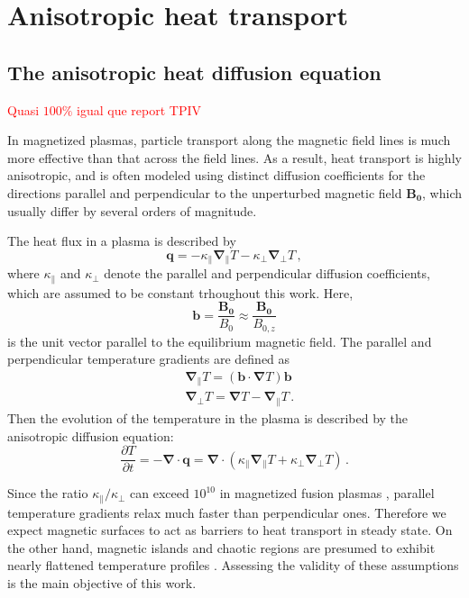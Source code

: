 \section{Anisotropic heat transport}
\subsection{The anisotropic heat diffusion equation}
\textcolor{red}{Quasi $100\%$ igual que report TPIV}

In magnetized plasmas, particle transport along the magnetic field lines is much more effective than that across the field lines. As a result, heat transport is highly anisotropic, and is often modeled using distinct diffusion coefficients for the directions parallel and perpendicular to the unperturbed magnetic field $\mathbf{B_0}$, which usually differ by several orders of magnitude.

The heat flux in a plasma is described by 
\begin{equation}
    \mathbf{q}=-\kappa_\parallel\boldsymbol{\nabla}_\parallel T - \kappa_\perp\boldsymbol{\nabla}_\perp T\,,
\end{equation}
where $\kappa_\parallel$ and $\kappa_\perp$ denote the parallel and perpendicular diffusion coefficients, which are assumed to be constant trhoughout this work. Here,
\begin{equation}
    \mathbf{b}=\frac{\mathbf{B_0}}{B_0}\approx\frac{\mathbf{B_0}}{B_{0,z}}
\end{equation}
is the unit vector parallel to the equilibrium magnetic field. The parallel and perpendicular temperature gradients are defined as
\begin{align}
    &\boldsymbol{\nabla}_\parallel T=(\mathbf{b}\cdot\boldsymbol{\nabla}T)\mathbf{b}\\
    &\boldsymbol{\nabla}_\perp T = \boldsymbol{\nabla} T - \boldsymbol{\nabla}_\parallel T\,.
\end{align}
Then the evolution of the temperature in the plasma is described by the anisotropic diffusion equation:
\begin{equation}
    \frac{\partial T}{\partial t}=-\boldsymbol{\nabla}\cdot\mathbf{q}=\boldsymbol{\nabla}\cdot(\kappa_\parallel\boldsymbol{\nabla}_\parallel T + \kappa_\perp\boldsymbol{\nabla}_\perp T)\,.
\end{equation}

Since the ratio $\kappa_\parallel/\kappa_\perp$ can exceed $10^{10}$ in magnetized fusion plasmas \cite{}, parallel temperature gradients relax much faster than perpendicular ones. Therefore we expect magnetic surfaces to act as barriers to heat transport in steady state. On the other hand, magnetic islands and chaotic regions are presumed to exhibit nearly flattened temperature profiles \cite{}. Assessing the validity of these assumptions is the main objective of this work.

